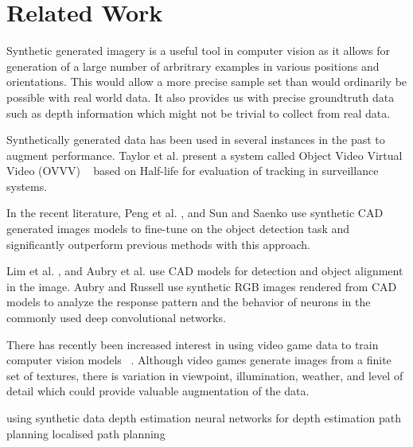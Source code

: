 \section{Related Work}
Synthetic generated imagery is a useful tool in computer vision as it allows for generation of a large number of arbritrary examples in various positions and orientations. This would allow a more precise sample set than would ordinarily be possible with real world data. It also provides us with precise groundtruth data such as depth information which might not be trivial to collect from real data.

Synthetically generated data has been used in several instances in the past to augment performance. Taylor et al. present a system called Object Video Virtual Video (OVVV) ~\cite{Taylor_2007} based on Half-life for evaluation of tracking in surveillance systems. 
 
In the recent literature, Peng et al. , and Sun and Saenko use synthetic CAD generated images models to fine-tune on the object detection task and significantly outperform previous methods with this approach. 

Lim et al. , and Aubry et al. use CAD models for detection and object alignment in the image. Aubry and Russell use synthetic RGB images rendered from CAD models to analyze the response pattern and the behavior of neurons in the commonly used deep convolutional networks.

There has recently been increased interest in using video game data to train computer vision models ~\cite{Shafaei_LS16}. Although video games generate images from a finite set of textures, there is variation in viewpoint, illumination, weather, and level of detail which could provide valuable augmentation of the data. 

using synthetic data
depth estimation
neural networks for depth estimation
path planning
localised path planning